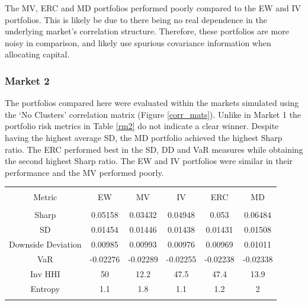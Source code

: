 \documentclass[11pt,preprint, authoryear]{elsarticle}
\let\origtable\table
\let\endorigtable\endtable
\renewenvironment{table}[1][2] {
    \expandafter\origtable\expandafter[H]
} {
    \endorigtable
}
\numberwithin{equation}{section}
\numberwithin{figure}{section}
\numberwithin{table}{section}
\begin{document}
The MV, ERC and MD portfolios performed poorly compared to the EW and IV
portfolios. This is likely be due to there being no real dependence in
the underlying market's correlation structure. Therefore, these
portfolios are more noisy in comparison, and likely use spurious
covariance information when allocating capital.

\hypertarget{market-2}{%
\subsubsection{Market 2}\label{market-2}}

The portfolios compared here were evaluated within the markets simulated
using the `No Clusters' correlation matrix (Figure \ref{corr_mats}).
Unlike in Market 1 the portfolio risk metrics in Table \ref{rm2} do not
indicate a clear winner. Despite having the highest average SD, the MD
portfolio achieved the highest Sharp ratio. The ERC performed best in
the SD, DD and VaR measures while obtaining the second highest Sharp
ratio. The EW and IV portfolios were similar in their performance and
the MV performed poorly.

\begin{table}[!htbp] \centering 
  \caption{Market 2 - Portfolio Risk Metrics} 
  \label{rm2} 
\begin{tabular}{@{\extracolsep{5pt}} cccccc} 
\\[-1.8ex]\hline 
\hline \\[-1.8ex] 
Metric & EW & MV & IV & ERC & MD \\ 
\hline \\[-1.8ex] 
Sharp & 0.05158 & 0.03432 & 0.04948 & 0.053 & 0.06484 \\ 
SD & 0.01454 & 0.01446 & 0.01438 & 0.01431 & 0.01508 \\ 
Downside Deviation & 0.00985 & 0.00993 & 0.00976 & 0.00969 & 0.01011 \\ 
VaR & -0.02276 & -0.02289 & -0.02255 & -0.02238 & -0.02338 \\ 
Inv HHI & 50 & 12.2 & 47.5 & 47.4 & 13.9 \\ 
Entropy & 1.1 & 1.8 & 1.1 & 1.2 & 2 \\ 
\hline \\[-1.8ex] 
\end{tabular} 
\end{table}
\end{document}
